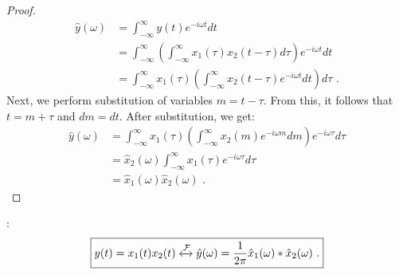 \begin{proof}
    \begin{align}
        \hat{y}(\omega) & = \int_{-\infty}^{\infty} y(t) e^{-i\omega t} dt                                                                       \\
                        & = \int_{-\infty}^{\infty} \left( \int_{-\infty}^{\infty} x_1(\tau) x_2(t-\tau) d\tau \right) e^{-i\omega t} dt         \\
                        & = \int_{-\infty}^{\infty}   x_1(\tau) \left( \int_{-\infty}^{\infty} x_2(t-\tau) e^{-i\omega t} dt \right) d\tau \,\,.
    \end{align}
    Next, we perform substitution of variables $m=t-\tau$. From this, it follows that $t=m+\tau$ and $dm=dt$. After substitution, we get:
    \begin{align}
        \hat{y}(\omega) & = \int_{-\infty}^{\infty}   x_1(\tau) \left( \int_{-\infty}^{\infty} x_2(m) e^{-i\omega m} dm \right) e^{-i\omega \tau} d\tau \\
                        & = \hat{x}_2(\omega) \int_{-\infty}^{\infty}   x_1(\tau)  e^{-i\omega \tau} d\tau                                              \\
                        & = \hat{x}_1(\omega)\hat{x}_2(\omega)\,\,.
    \end{align}
\end{proof}
:
\begin{equation}
    \boxed{
        y(t) = x_1(t)x_2(t) \xleftrightarrow{\mathcal{F}} \hat{y}(\omega) = \frac{1}{2\pi}\hat{x}_1(\omega) * \hat{x}_2(\omega)\,\,.
    }
\end{equation}
